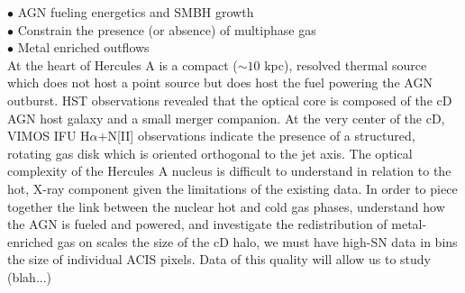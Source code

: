 \documentclass[12pt,letterpaper]{article}
\begin{document}
\noindent$\bullet$ AGN fueling energetics and SMBH growth\\
\noindent$\bullet$ Constrain the presence (or absence) of multiphase gas\\
\noindent$\bullet$ Metal enriched outflows\\

At the heart of Hercules A is a compact ($\sim 10$ kpc), resolved
thermal source which does not host a point source but does host the
fuel powering the AGN outburst. HST observations revealed that the
optical core is composed of the cD AGN host galaxy and a small merger
companion. At the very center of the cD, VIMOS IFU H$\alpha$+N[II]
observations indicate the presence of a structured, rotating gas disk
which is oriented orthogonal to the jet axis. The optical complexity
of the Hercules A nucleus is difficult to understand in relation to
the hot, X-ray component given the limitations of the existing
data. In order to piece together the link between the nuclear hot and
cold gas phases, understand how the AGN is fueled and powered, and
investigate the redistribution of metal-enriched gas on scales the
size of the cD halo, we must have high-SN data in bins the size of
individual ACIS pixels. Data of this quality will allow us to study
(blah...)
\end{document}
